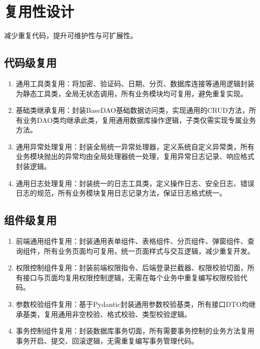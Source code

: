 \documentclass[12pt, a4paper]{article}
\begin{document}
\newpage
\section{复用性设计}

减少重复代码，提升可维护性与可扩展性。

\subsection{代码级复用}

\begin{enumerate}
\item  通用工具类复用：将加密、验证码、日期、分页、数据库连接等通用逻辑封装为静态工具类，全局无状态调用，所有业务模块均可复用，避免重复实现。

\item  基础类继承复用：封装BaseDAO基础数据访问类，实现通用的CRUD方法，所有业务DAO类均继承此类，复用通用数据库操作逻辑，子类仅需实现专属业务方法。

\item  通用异常处理复用：封装全局统一异常处理器，定义系统自定义异常类，所有业务模块抛出的异常均由全局处理器统一处理，复用异常日志记录、响应格式封装逻辑。

\item  通用日志处理复用：封装统一的日志工具类，定义操作日志、安全日志、错误日志的规范，所有业务模块复用日志记录方法，保证日志格式统一。
\end{enumerate}

\subsection{组件级复用}

\begin{enumerate}
\item  前端通用组件复用：封装通用表单组件、表格组件、分页组件、弹窗组件、查询组件，所有业务页面均可复用，统一页面样式与交互逻辑，减少重复开发。

\item  权限控制组件复用：封装前端权限指令、后端登录拦截器、权限校验切面，所有接口与页面均复用权限控制逻辑，无需在每个业务中重复编写权限校验代码。

\item  参数校验组件复用：基于Pydantic封装通用参数校验基类，所有接口DTO均继承基类，复用通用非空校验、格式校验、类型校验逻辑。

\item  事务控制组件复用：封装数据库事务切面，所有需要事务控制的业务方法复用事务开启、提交、回滚逻辑，无需重复编写事务管理代码。
\end{enumerate}
\end{document}
